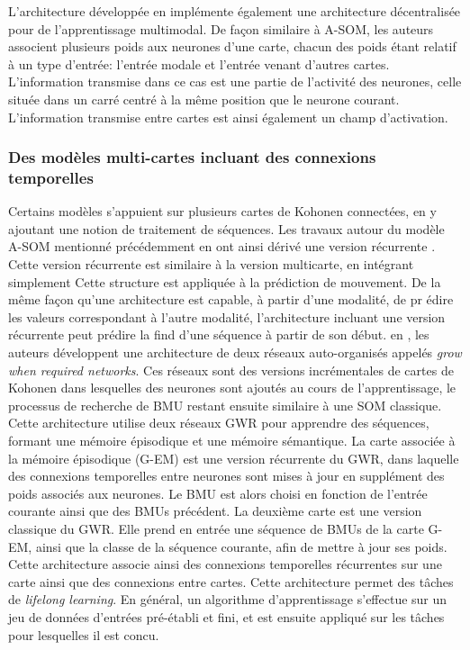 \documentclass[../main]{subfiles}
\begin{document}
L'architecture développée en \cite{lefort_active_2015} implémente également une architecture décentralisée pour de l'apprentissage multimodal. De façon similaire à A-SOM, les auteurs associent plusieurs poids aux neurones d'une carte, chacun des poids étant relatif à un type d'entrée: l'entrée modale et l'entrée venant d'autres cartes. L'information transmise dans ce cas est une partie de l'activité des neurones, celle située dans un carré centré à la même position que le neurone courant. L'information transmise entre cartes est ainsi également un champ d'activation.

\subsubsection{Des modèles multi-cartes incluant des connexions temporelles}

Certains modèles s'appuient sur plusieurs cartes de Kohonen connectées, en y ajoutant une notion de traitement de séquences.
Les travaux autour du modèle A-SOM mentionné précédemment en ont ainsi dérivé une version récurrente \cite{Buonamente2015DiscriminatingAS}. Cette version récurrente est similaire à la version multicarte, en intégrant simplement
Cette structure est appliquée à la prédiction de mouvement. De la même façon qu'une architecture est capable, à partir d'une modalité, de pr
édire les valeurs correspondant à l'autre modalité, l'architecture incluant une version récurrente peut prédire la find d'une séquence à partir de son début.
en \cite{parisiLL}, les auteurs développent une architecture de deux réseaux auto-organisés appelés \emph{grow when required networks}. Ces réseaux sont des versions incrémentales de cartes de Kohonen dans lesquelles des neurones sont ajoutés au cours de l'apprentissage, le processus de recherche de BMU restant ensuite similaire à une SOM classique.
Cette architecture utilise deux réseaux GWR pour apprendre des séquences, formant une mémoire épisodique et une mémoire sémantique.
La carte associée à la mémoire épisodique (G-EM) est une version récurrente du GWR, dans laquelle des connexions temporelles entre neurones sont mises à jour en supplément des poids associés aux neurones. Le BMU est alors choisi en fonction de l'entrée courante ainsi que des BMUs précédent. 
La deuxième carte est une version classique du GWR. Elle prend en entrée une séquence de BMUs de la carte G-EM, ainsi que la classe de la séquence courante, afin de mettre à jour ses poids. 
Cette architecture associe ainsi des connexions temporelles récurrentes sur une carte ainsi que des connexions entre cartes.
Cette architecture permet des tâches de \emph{lifelong learning}. En général, un algorithme d'apprentissage s'effectue sur un jeu de données d'entrées pré-établi et fini, et est ensuite appliqué sur les tâches pour lesquelles il est concu.
\end{document}
